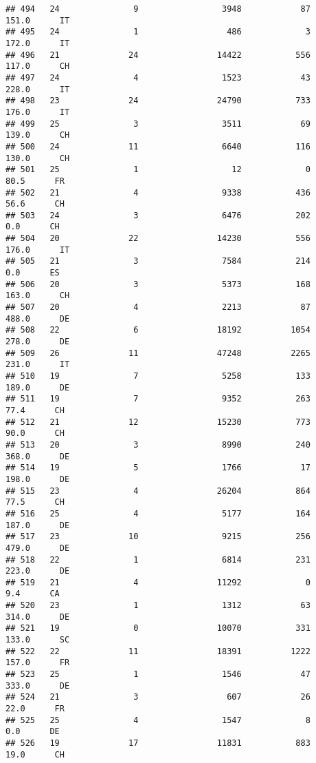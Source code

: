 \documentclass[
]{article}
\begin{document}
\begin{verbatim}
## 494   24               9                 3948            87    151.0      IT
## 495   24               1                  486             3    172.0      IT
## 496   21              24                14422           556    117.0      CH
## 497   24               4                 1523            43    228.0      IT
## 498   23              24                24790           733    176.0      IT
## 499   25               3                 3511            69    139.0      CH
## 500   24              11                 6640           116    130.0      CH
## 501   25               1                   12             0     80.5      FR
## 502   21               4                 9338           436     56.6      CH
## 503   24               3                 6476           202      0.0      CH
## 504   20              22                14230           556    176.0      IT
## 505   21               3                 7584           214      0.0      ES
## 506   20               3                 5373           168    163.0      CH
## 507   20               4                 2213            87    488.0      DE
## 508   22               6                18192          1054    278.0      DE
## 509   26              11                47248          2265    231.0      IT
## 510   19               7                 5258           133    189.0      DE
## 511   19               7                 9352           263     77.4      CH
## 512   21              12                15230           773     90.0      CH
## 513   20               3                 8990           240    368.0      DE
## 514   19               5                 1766            17    198.0      DE
## 515   23               4                26204           864     77.5      CH
## 516   25               4                 5177           164    187.0      DE
## 517   23              10                 9215           256    479.0      DE
## 518   22               1                 6814           231    223.0      DE
## 519   21               4                11292             0      9.4      CA
## 520   23               1                 1312            63    314.0      DE
## 521   19               0                10070           331    133.0      SC
## 522   22              11                18391          1222    157.0      FR
## 523   25               1                 1546            47    333.0      DE
## 524   21               3                  607            26     22.0      FR
## 525   25               4                 1547             8      0.0      DE
## 526   19              17                11831           883     19.0      CH

\end{verbatim}
\end{document}
